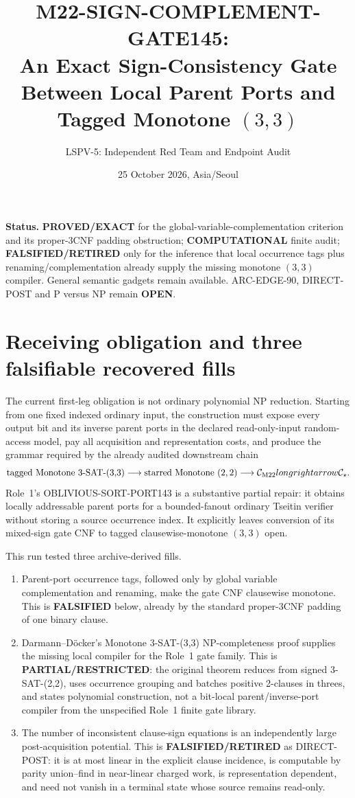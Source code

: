 \documentclass[11pt]{article}
\title{M22-SIGN-COMPLEMENT-GATE145:\\
An Exact Sign-Consistency Gate Between Local Parent Ports and Tagged Monotone $(3,3)$}
\author{LSPV-5: Independent Red Team and Endpoint Audit}
\date{25 October 2026, Asia/Seoul}
\newcommand{\OPEN}{\textbf{OPEN}}
\begin{document}
\maketitle

\noindent\textbf{Status.} \textbf{PROVED/EXACT} for the global-variable-complementation criterion and its proper-3CNF padding obstruction; \textbf{COMPUTATIONAL} finite audit; \textbf{FALSIFIED/RETIRED} only for the inference that local occurrence tags plus renaming/complementation already supply the missing monotone $(3,3)$ compiler.  General semantic gadgets remain available.  ARC-EDGE-90, DIRECT-POST and P versus NP remain \OPEN.

\section{Receiving obligation and three falsifiable recovered fills}
The current first-leg obligation is not ordinary polynomial NP reduction.  Starting from one fixed indexed ordinary input, the construction must expose every output bit and its inverse parent ports in the declared read-only-input random-access model, pay all acquisition and representation costs, and produce the grammar required by the already audited downstream chain
\[
 \text{tagged Monotone 3-SAT-(3,3)}\longrightarrow
 \text{starred Monotone $(2,2)$}\longrightarrow\mathcal C_{\rm M22}longrightarrow\mathcal C_\star.
\]
Role~1's OBLIVIOUS-SORT-PORT143 is a substantive partial repair: it obtains locally addressable parent ports for a bounded-fanout ordinary Tseitin verifier without storing a source occurrence index.  It explicitly leaves conversion of its mixed-sign gate CNF to tagged clausewise-monotone $(3,3)$ open.

This run tested three archive-derived fills.
\begin{enumerate}
\item[(H1)] Parent-port occurrence tags, followed only by global variable complementation and renaming, make the gate CNF clausewise monotone.  This is \textbf{FALSIFIED} below, already by the standard proper-3CNF padding of one binary clause.
\item[(H2)] Darmann--D\"ocker's Monotone 3-SAT-(3,3) NP-completeness proof supplies the missing local compiler for the Role~1 gate family.  This is \textbf{PARTIAL/RESTRICTED}: the original theorem reduces from signed 3-SAT-(2,2), uses occurrence grouping and batches positive 2-clauses in threes, and states polynomial construction, not a bit-local parent/inverse-port compiler from the unspecified Role~1 finite gate library.
\item[(H3)] The number of inconsistent clause-sign equations is an independently large post-acquisition potential.  This is \textbf{FALSIFIED/RETIRED} as DIRECT-POST: it is at most linear in the explicit clause incidence, is computable by parity union--find in near-linear charged work, is representation dependent, and need not vanish in a terminal state whose source remains read-only.
\end{enumerate}
\end{document}
